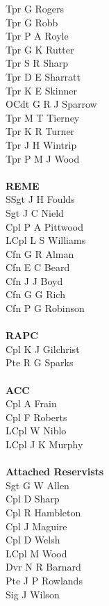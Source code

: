 \begin{multicols}{4}
  Tpr G Rogers \\
  Tpr G Robb \\
  Tpr P A Royle \\
  Tpr G K Rutter \\
  Tpr S R Sharp \\
  Tpr D E Sharratt \\
  Tpr K E Skinner \\
  OCdt G R J Sparrow \\
  Tpr M T Tierney \\
  Tpr K R Turner \\
  Tpr J H Wintrip \\
  Tpr P M J Wood \\
  \\
  \textbf{REME} \\
  SSgt J H Foulds \\
  Sgt J C Nield \\
  Cpl P A Pittwood \\
  LCpl L S Williams \\
  Cfn G R Alman \\
  Cfn E C Beard \\
  Cfn J J Boyd \\
  Cfn G G Rich \\
  Cfn P G Robinson \\
  \\
  \textbf{RAPC} \\
  Cpl K J Gilchrist \\
  Pte R G Sparks \\
  \\
  \textbf{ACC} \\
  Cpl A Frain \\
  Cpl F Roberts \\
  LCpl W Niblo \\
  LCpl J K Murphy \\
  \\
  \textbf{Attached Reservists} \\
  Sgt G W Allen \\
  Cpl D Sharp \\
  Cpl R Hambleton \\
  Cpl J Maguire \\
  Cpl D Welsh \\
  LCpl M Wood \\
  Dvr N R Barnard \\
  Pte J P Rowlands \\
  Sig J Wilson \\
  \\

\end{multicols}

